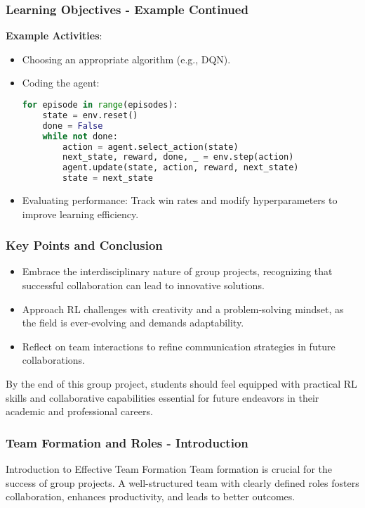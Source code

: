 \documentclass{beamer}
\begin{document}
\begin{frame}[fragile]
    \frametitle{Learning Objectives - Example Continued}
    \textbf{Example Activities}:
    \begin{itemize}
        \item Choosing an appropriate algorithm (e.g., DQN).
        \item Coding the agent:
        \begin{lstlisting}[language=python]
for episode in range(episodes):
    state = env.reset()
    done = False
    while not done:
        action = agent.select_action(state)
        next_state, reward, done, _ = env.step(action)
        agent.update(state, action, reward, next_state)
        state = next_state
        \end{lstlisting}
        \item Evaluating performance: Track win rates and modify hyperparameters to improve learning efficiency.
    \end{itemize}
\end{frame}

\begin{frame}[fragile]
    \frametitle{Key Points and Conclusion}
    \begin{itemize}
        \item Embrace the interdisciplinary nature of group projects, recognizing that successful collaboration can lead to innovative solutions.
        \item Approach RL challenges with creativity and a problem-solving mindset, as the field is ever-evolving and demands adaptability.
        \item Reflect on team interactions to refine communication strategies in future collaborations.
    \end{itemize}
    By the end of this group project, students should feel equipped with practical RL skills and collaborative capabilities essential for future endeavors in their academic and professional careers.
\end{frame}

\begin{frame}[fragile]
    \frametitle{Team Formation and Roles - Introduction}
    \begin{block}{Introduction to Effective Team Formation}
        Team formation is crucial for the success of group projects. A well-structured team with clearly defined roles fosters collaboration, enhances productivity, and leads to better outcomes.
    \end{block}
\end{frame}
\end{document}

